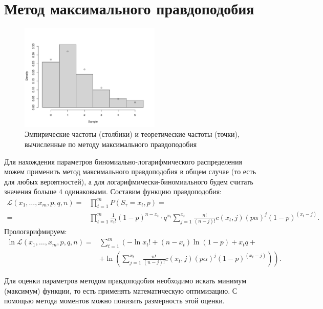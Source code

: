 \documentclass[12pt, specialist, subf, substylefile = spbu_report.rtx]{disser}
\begin{document}
	\section{Метод максимального правдоподобия}
	
	\label{MMP}
	
	\begin{figure}[ht]
		\centering
		\includegraphics[width = 0.6\textwidth]{binlogexpprob}
		\caption{Эмпирические частоты (столбики) и теоретические частоты (точки), вычисленные по методу максимального правдоподобия}
		\label{img:binlogexpprob}
	\end{figure}
	
	Для нахождения параметров биномиально-логарифмического распределения можем применить метод максимального правдоподобия в общем случае (то есть для любых вероятностей), а для логарифмически-биномиального будем считать значения больше $ 4 $ одинаковыми. Составим функцию правдоподобия:
	\[
		\begin{aligned}
			\mathcal{L} (x _1, \dots, x _m, p, q, n) =& \prod \limits ^m _{t = 1} P(S _\tau = x _t, p) =\\
			=& \prod \limits ^m _{t = 1} \frac 1 {x _t!} (1 - p) ^{n - x _t} \cdot q ^{x _t} \sum \limits ^{x _t} _{j = 1} \frac {n!} {(n - j)!} c(x _t, j) (p \alpha) ^j (1 - p) ^{(x _t - j)}.
		\end{aligned}
	\] 
	Прологарифмируем:
	\[
		\begin{aligned}
			\ln \mathcal{L} (x _1, \dots, x _m, p, q, n) =& \sum \limits ^m _{t = 1} \left( -\ln x _t! + (n - x _t) \ln (1 - p) + x _t q +\right.\\
			&\left.+ \ln \left( \sum \limits ^{x _t} _{j = 1} \frac {n!} {(n - j)!} c(x _t, j) (p \alpha) ^j (1 - p) ^{(x _t - j)} \right) \right).
		\end{aligned}
	\]
	
	Для оценки параметров методом правдоподобия необходимо искать минимум (максимум)  функции, то есть применять математическую оптимизацию. С помощью метода моментов можно понизить размерность этой оценки.
	
\end{document}
